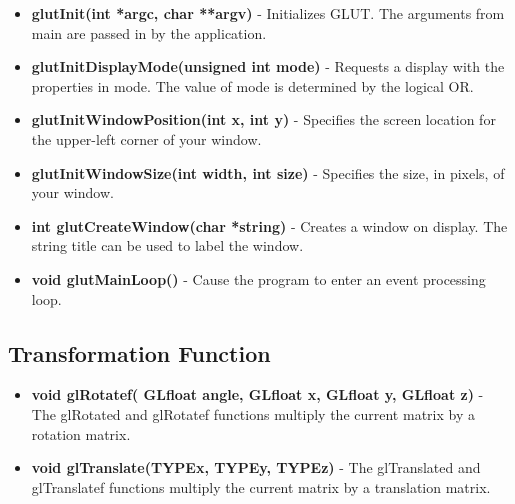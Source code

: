 \documentclass[fontsize=12pt]{article}
\begin{document}
\begin{itemize}
\item \textbf{glutInit(int *argc, char **argv)} 
- Initializes GLUT. The arguments from main are passed in by the application.
\end{itemize}
\begin{itemize}
\item \textbf{glutInitDisplayMode(unsigned int mode)}
- Requests a display with the properties in mode. The value of mode is determined by the logical OR.
\end{itemize}
\begin{itemize}
\item \textbf{glutInitWindowPosition(int x, int y)}
- Specifies the screen location for the upper-left corner of your window.
\end{itemize}
\begin{itemize}
\item \textbf{glutInitWindowSize(int width, int size)}
- Specifies the size, in pixels, of your window.
\end{itemize}
\begin{itemize}
\item \textbf{int glutCreateWindow(char *string)}
- Creates a window on display. The string title can be used to label the window.
\end{itemize}
\begin{itemize}
\item \textbf{void glutMainLoop()}
- Cause the program to enter an event processing loop.
\end{itemize}

\subsection{Transformation Function}
\begin{itemize}
\item \textbf{void glRotatef( GLfloat angle, GLfloat x, GLfloat y, GLfloat z)}
- The glRotated and glRotatef functions multiply the current matrix by a rotation matrix.
\end{itemize}
\begin{itemize}
\item \textbf{void glTranslate(TYPEx, TYPEy, TYPEz)}
- The glTranslated and glTranslatef functions multiply the current matrix by a translation matrix.
\end{itemize}
\end{document}
